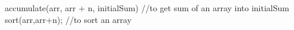accumulate(arr, arr + n, initialSum)   //to get sum of an array into initialSum 
sort(arr,arr+n);                       //to sort an array